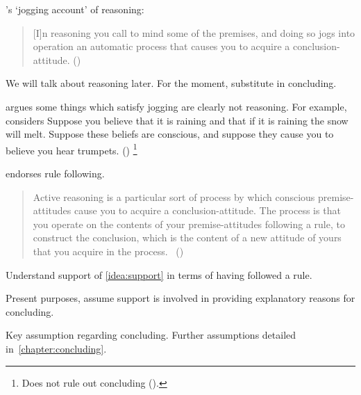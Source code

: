 \begin{note}
  \citeauthor{Broome:2002aa}'s `jogging account' of reasoning:

  \begin{quote}
    [I]n reasoning you call to mind some of the premises, and doing so jogs into operation an automatic process that causes you to acquire a conclusion-attitude.%
    \mbox{}\hfill\mbox{(\citeyear[226]{Broome:2002aa})}
  \end{quote}

  {
    \color{red}
    We will talk about reasoning later.
    For the moment, substitute in concluding.
    }

  \citeauthor{Broome:2002aa} argues some things which satisfy jogging are clearly not reasoning.
  For example, \citeauthor{Broome:2002aa} considers
  {
    \color{red}
    Suppose you believe that it is raining and that if it is raining the snow will melt. Suppose these beliefs are conscious, and suppose they cause you to believe you hear trumpets.
  }
  (\citeyear[225,226--227]{Broome:2002aa})%
  \footnote{
    Does not rule out concluding (\citeyear[231,233]{Broome:2002aa}).
  }

  \citeauthor{Broome:2002aa} endorses rule following.

  \begin{quote}
    Active reasoning is a particular sort of process by which conscious premise-attitudes cause you to acquire a conclusion-attitude.
    The process is that you operate on the contents of your premise-attitudes following a rule, to construct the conclusion, which is the content of a new attitude of yours that you acquire in the process.\newline
    \mbox{ }\hfill\mbox{(\citeyear[234]{Broome:2002aa})}
  \end{quote}

  Understand support of \autoref{idea:support} in terms of having followed a rule.
\end{note}

\begin{note}
  Present purposes, assume support is involved in providing explanatory reasons for concluding.
\end{note}

\begin{note}
  Key assumption regarding concluding.
  Further assumptions detailed in~\autoref{chapter:concluding}.
\end{note}

